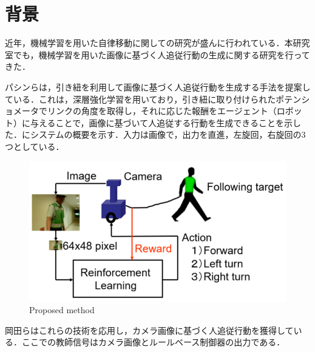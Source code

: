 
\section{背景}
近年，機械学習を用いた自律移動に関しての研究が盛んに行われている．本研究室でも，機械学習を用いた画像に基づく人追従行動の生成に関する研究を行ってきた．

パシンら\cite{pasin1}\cite{pasin2}\cite{pasin3}は，引き紐を利用して画像に基づく人追従行動を生成する手法を提案している．これは，深層強化学習\cite{hado}を用いており，引き紐に取り付けられたポテンショメータでリンクの角度を取得し，それに応じた報酬をエージェント（ロボット）に与えることで，画像に基づいて人追従する行動を生成できることを示した．にシステムの概要を示す．入力は画像で，出力を直進，左旋回，右旋回の3つとしている．

  \begin{figure}[h]
    \centering
    \includegraphics[keepaspectratio, scale=0.45] {images/pasin_system.png}
    \caption{Proposed method \cite{pasin1}}
    \label{Fig:pasin_system}
  \end{figure}

岡田ら\cite{okada}はこれらの技術を応用し，カメラ画像に基づく人追従行動を獲得している．ここでの教師信号はカメラ画像とルールベース制御器の出力である．


